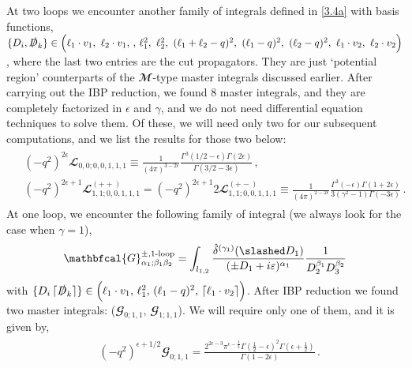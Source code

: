 At two loops we encounter another family of integrals defined in \eqref{3.4a} with basis functions,
 $\{D_i,\slashed D_k\}\in\Big(\ell_{1}\cdot v_1,\,\,\ell_{2}\cdot v_1,\,,\,\ell_{1}^2,\,\, \ell_{2}^2,\,\, (\ell_{1}+\ell_{2}-q)^2,\,\, (\ell_{1}-q)^2,\,\, (\ell_{2}-q)^2,\,\, \ell_{1}\cdot v_2,\,\, \ell_{2}\cdot v_2\Big) $, where the last two entries are the cut propagators. They are just `potential region' counterparts of the $\mathbfcal{M}$-type master integrals discussed earlier. After carrying out the  IBP reduction, we found 8 master integrals, and they are completely factorized in $\epsilon$ and $\gamma$, and we do not need differential equation techniques to solve them. Of these, we will need only two for our subsequent computations, and we list the results for those two below:
 \begin{align}
     \begin{split}
& (-q^2)^{2\epsilon}\mathbfcal{L}_{0,0;0,0,1,1,1}\equiv \frac{1}{(4\pi)^{3-2\epsilon}}\frac{\Gamma^3(1/2-\epsilon)\Gamma(2\epsilon)}{\Gamma(3/2-3\epsilon)}\,,\\ &
(-q^2)^{2\epsilon+1}\mathbfcal{L}^{(++)}_{1,1;0,0,1,1,1}=(-q^2)^{2\epsilon+1}2\mathbfcal{L}^{(+-)}_{1,1;0,0,1,1,1}\equiv \frac{1}{(4\pi)^{2-2\epsilon}}\frac{\Gamma^3(-\epsilon)\Gamma(1+2\epsilon)}{3(\gamma^2-1)\Gamma(-3\epsilon)}\,. \label{MasterL}
\end{split}
 \end{align}
At one loop, we encounter the following family of integral (we always look for the case when $\gamma=1$),
\begin{align}
    \begin{split}
        \mathbfcal{G}^{\pm,\textrm{1-loop}}_{\alpha_1;\beta_1 \beta_{2}}=\int_{l_{1,2}}\frac{\hat\delta^{(\gamma_1)}(\slashed D_1)}{(\pm D_1+i\varepsilon)^{\alpha_1}}\frac{1}{D_2^{\beta_1}D_3^{\beta_2}}\label{3.41a}
    \end{split}
\end{align}
with $\{D_i\,\lceil\slashed D_k\rceil\}\in \Big(\ell_{1}\cdot v_1,\,\ell_{1}^2,\,(\ell_{1}-q)^2,\,\lceil \ell_{1}\cdot v_2\rceil\Big)$. After IBP reduction we found two master integrals: ($\mathbfcal{G}_{0;1,1},\,\mathbfcal{G}_{1;1,1}$). We will require only one of them, and it is given by,
\begin{align}
    \begin{split}
        &(-q^2)^{\epsilon+1/2}\mathbfcal{G}_{0;1,1}=\frac{2^{2 \epsilon -3} \pi ^{\epsilon -\frac{3}{2}} \Gamma \left(\frac{1}{2}-\epsilon \right)^2 \Gamma \left(\epsilon +\frac{1}{2}\right)}{\Gamma (1-2 \epsilon )}\,. \label{3.4aa}
    \end{split}
\end{align}
